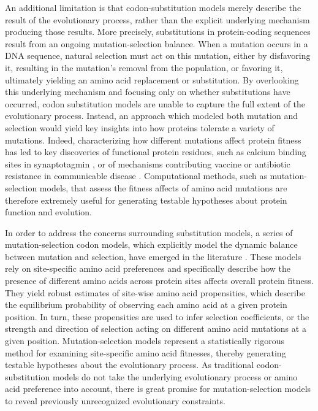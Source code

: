 \documentclass[11pt]{article}
\begin{document}
An additional limitation is that codon-substitution models merely describe the result of the evolutionary process, rather than the explicit underlying mechanism producing those results. More precisely, substitutions in protein-coding sequences result from an ongoing mutation-selection balance. When a mutation occurs in a DNA sequence, natural selection must act on this mutation, either by disfavoring it, resulting in the mutation's removal from the population, or favoring it, ultimately yielding an amino acid replacement or substitution. By overlooking this underlying mechanism and focusing only on whether substitutions have occurred, codon substitution models are unable to capture the full extent of the evolutionary process. Instead, an approach which modeled both mutation and selection would yield key insights into how proteins tolerate a variety of mutations. Indeed, characterizing how different mutations affect protein fitness has led to key discoveries of functional protein residues, such as calcium binding sites in synaptotagmin \cite{Xiangyang1998, Nishiki2004}, or of mechanisms contributing vaccine or antibiotic resistance in communicable disease \cite{vanDoorn2003, Bloom2010, Quashie2012, Bloom2013, Acevedo2014}. Computational methods, such as mutation-selection models, that assess the fitness affects of amino acid mutations are therefore extremely useful for generating testable hypotheses about protein function and evolution.

In order to address the concerns surrounding substitution models, a series of mutation-selection codon models, which explicitly model the dynamic balance between mutation and selection, have emerged in the literature \cite{HalpernBruno1998, Yang2008, Rodrigue2010, Tamuri2012}. These models rely on site-specific amino acid preferences and specifically describe how the presence of different amino acids across protein sites affects overall protein fitness. They yield robust estimates of site-wise amino acid propensities, which describe the equilibrium probability of observing each amino acid at a given protein position. In turn, these propensities are used to infer selection coefficients, or the strength and direction of selection acting on different amino acid mutations at a given position. Mutation-selection models represent a statistically rigorous method for examining site-specific amino acid fitnesses, thereby generating testable hypotheses about the evolutionary process. As traditional codon-substitution models do not take the underlying evolutionary process or amino acid preference into account, there is great promise for mutation-selection models to reveal previously unrecognized evolutionary constraints. 
\end{document}
